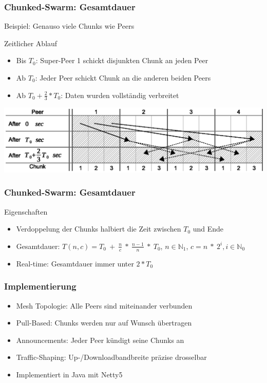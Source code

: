 \begin{frame}
  \frametitle{Chunked-Swarm: Gesamtdauer}
  Beispiel: Genauso viele Chunks wie Peers
  \begin{exampleblock}{Zeitlicher Ablauf}
    \begin{itemize}
      \item Bis $T_0$: Super-Peer 1 schickt disjunkten Chunk an jeden Peer
      \item Ab $T_0$: Jeder Peer schickt Chunk an die anderen beiden Peers
      \item Ab $T_0 + \frac{2}{3} * T_0$: Daten wurden vollständig verbreitet
    \end{itemize}
  \end{exampleblock}
  \begin{center}
    \includegraphics[width=1\textwidth]{fig/chunkedswarmformula1.eps}
  \end{center}
\end{frame}


\begin{frame}
  \frametitle{Chunked-Swarm: Gesamtdauer}
  \begin{block}{Eigenschaften}
    \begin{itemize}  
      \item Verdoppelung der Chunks halbiert die Zeit zwischen $T_0$ und Ende
      \vspace{2mm}
      \item Gesamtdauer: $T(n, c) = T_0\:+\:\frac{n}{c}\:*\:\frac{n-1}{n}\:*\:T_0$, $n \in \mathbb{N}_1$, $c = n\:*\:2^i, i \in \mathbb{N}_0$
      \vspace{2mm}
      \item Real-time: Gesamtdauer immer unter $2 * T_0$
    \end{itemize}
  \end{block}
\end{frame}


\begin{frame}
  \frametitle{Implementierung}
  \begin{itemize}  
    \item Mesh Topologie: Alle Peers sind miteinander verbunden
    \vspace{1mm}
    \item Pull-Based: Chunks werden nur auf Wunsch übertragen
    \vspace{1mm}
    \item Announcements: Jeder Peer kündigt seine Chunks an
    \vspace{1mm}
    \item Traffic-Shaping: Up-/Downloadbandbreite präzise drosselbar
    \vspace{1mm}
    \item Implementiert in Java mit Netty5
  \end{itemize} 
\end{frame}


